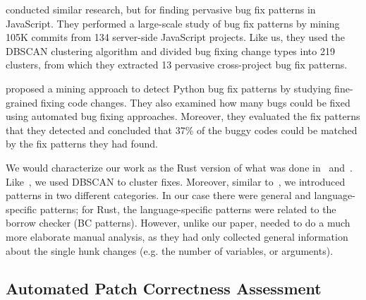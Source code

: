 \cite{hanam2016discovering} conducted similar research, but for finding pervasive bug fix patterns in JavaScript. They performed a large-scale study of bug fix patterns by mining 105K commits from 134 server-side JavaScript projects. Like us, they used the DBSCAN clustering algorithm and divided bug fixing change types into 219 clusters, from which they extracted 13 pervasive cross-project bug fix patterns. 

\cite{yang2022mining} proposed a mining approach to detect Python bug fix patterns by studying fine-grained fixing code changes. They also examined how many bugs could be fixed using automated bug fixing approaches. Moreover, they evaluated the fix patterns that they detected and concluded that 37\% of the buggy codes could be matched by the fix patterns they had found. 

We would characterize our work as the Rust version of what was done in~\cite{hanam2016discovering} and~\cite{yang2022mining}. Like~\cite{hanam2016discovering}, we used DBSCAN to cluster fixes. Moreover, similar to~\cite{yang2022mining}, we introduced patterns in two different categories. In our case there were general and language-specific patterns; for Rust, the language-specific patterns were related to the borrow checker (BC patterns). However, unlike our paper, \cite{yang2022mining} needed to do a much more elaborate manual analysis, as they had only collected general information about the single hunk changes (e.g. the number of variables, or arguments).

\subsection{Automated Patch Correctness Assessment}

